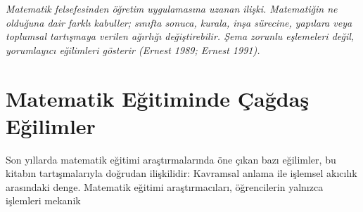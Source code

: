 {\small\itshape\sffamily\color{gray}Matematik felsefesinden öğretim uygulamasına uzanan ilişki. Matematiğin ne olduğuna dair farklı kabuller; sınıfta sonuca, kurala, inşa sürecine, yapılara veya toplumsal tartışmaya verilen ağırlığı değiştirebilir. Şema zorunlu eşlemeleri değil, yorumlayıcı eğilimleri gösterir (Ernest 1989; Ernest 1991).}

\section{Matematik Eğitiminde Çağdaş Eğilimler}

Son yıllarda matematik eğitimi araştırmalarında öne çıkan bazı eğilimler, bu kitabın tartışmalarıyla doğrudan ilişkilidir: Kavramsal anlama ile işlemsel akıcılık arasındaki denge. Matematik eğitimi araştırmacıları, öğrencilerin yalnızca işlemleri mekanik

